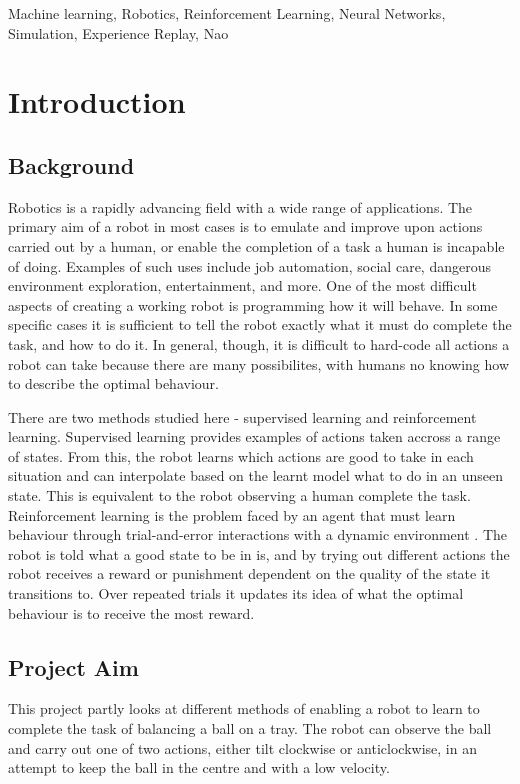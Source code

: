 \documentclass[12pt,a4paper]{article}
\begin{document}
\begin{keywords}
Machine learning, Robotics, Reinforcement Learning, Neural Networks, Simulation, Experience Replay, Nao
\end{keywords}

\section{Introduction}
\subsection{Background}
Robotics is a rapidly advancing field with a wide range of applications. The primary aim of a robot in most cases is to emulate and improve upon actions carried out by a human, or enable the completion of a task a human is incapable of doing. Examples of such uses include job automation, social care, dangerous environment exploration, entertainment, and more. One of the most difficult aspects of creating a working robot is programming how it will behave. In some specific cases it is sufficient to tell the robot exactly what it must do complete the task, and how to do it. In general, though, it is difficult to hard-code all actions a robot can take because there are many possibilites, with humans no knowing how to describe the optimal behaviour. 

There are two methods studied here - supervised learning and reinforcement learning. Supervised learning provides examples of actions taken accross a range of states. From this, the robot learns which actions are good to take in each situation and can interpolate based on the learnt model what to do in an unseen state. This is equivalent to the robot observing a human complete the task. Reinforcement learning is the problem faced by an agent that must learn behaviour through trial-and-error interactions with a dynamic environment \cite{rl_survey}. The robot is told what a good state to be in is, and by trying out different actions the robot receives a reward or punishment dependent on the quality of the state it transitions to. Over repeated trials it updates its idea of what the optimal behaviour is to receive the most reward.

\subsection{Project Aim}
This project partly looks at different methods of enabling a robot to learn to complete the task of balancing a ball on a tray. The robot can observe the ball and carry out one of two actions, either tilt clockwise or anticlockwise, in an attempt to keep the ball in the centre and with a low velocity. 
\end{document}
